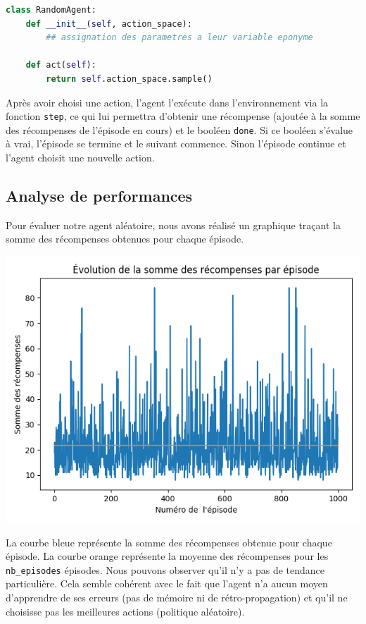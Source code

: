 \documentclass[10pt,a4paper]{article}
\begin{document}
\begin{lstlisting}[language=Python, caption=Implémentation de l'agent aléatoire]
class RandomAgent:
    def __init__(self, action_space):
        ## assignation des parametres a leur variable eponyme

    def act(self):
        return self.action_space.sample()
\end{lstlisting}
Après avoir choisi une action, l'agent l'exécute dans l'environnement via la fonction \lstinline{step}, ce qui lui permettra d'obtenir une récompense (ajoutée à la somme des récompenses de l'épisode en cours) et le booléen \lstinline{done}. Si ce booléen s'évalue à vrai, l'épisode se termine et le suivant commence. Sinon l'épisode continue et l'agent choisit une nouvelle action.

\subsection{Analyse de performances}


Pour évaluer notre agent aléatoire, nous avons réalisé un graphique traçant la somme des récompenses obtenues pour chaque épisode.

\includegraphics[scale=0.5]{evolution_recompenses_random.png} 

La courbe bleue représente la somme des récompenses obtenue pour chaque épisode. La courbe orange représente la moyenne des récompenses pour les \lstinline{nb_episodes} épisodes. Nous pouvons observer qu'il n'y a pas de tendance particulière. Cela semble cohérent avec le fait que l'agent n'a aucun moyen d'apprendre de ses erreurs (pas de mémoire ni de rétro-propagation) et qu'il ne choisisse pas les meilleures actions (politique aléatoire). 
\end{document}

